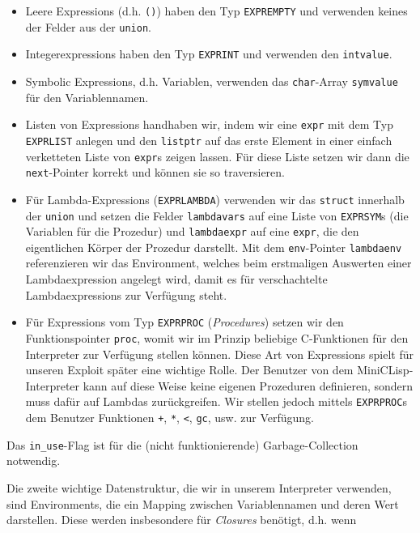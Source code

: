 \begin{itemize}
    \item Leere Expressions (d.h. \texttt{()}) haben den Typ \texttt{EXPREMPTY}
      und verwenden keines der Felder aus der \texttt{union}.
    \item Integerexpressions haben den Typ \texttt{EXPRINT} und verwenden den
      \texttt{intvalue}.
    \item Symbolic Expressions, d.h. Variablen, verwenden das
      \texttt{char}-Array \texttt{symvalue} für den Variablennamen.
    \item Listen von Expressions handhaben wir, indem wir eine \texttt{expr}
      mit dem Typ \texttt{EXPRLIST} anlegen und den \texttt{listptr} auf das
      erste Element in einer einfach verketteten Liste von \texttt{expr}s
      zeigen lassen. Für diese Liste setzen wir dann die \texttt{next}-Pointer
      korrekt und können sie so traversieren.
    \item Für Lambda-Expressions (\texttt{EXPRLAMBDA}) verwenden wir das
      \texttt{struct} innerhalb der \texttt{union} und setzen die Felder
      \texttt{lambdavars} auf eine Liste von \texttt{EXPRSYM}s (die Variablen
      für die Prozedur) und \texttt{lambdaexpr} auf eine \texttt{expr}, die
      den eigentlichen Körper der Prozedur darstellt. Mit dem \texttt{env}-Pointer
      \texttt{lambdaenv} referenzieren wir das Environment, welches beim
      erstmaligen Auswerten einer Lambdaexpression angelegt wird, damit es für
      verschachtelte Lambdaexpressions zur Verfügung steht.
    \item Für Expressions vom Typ \texttt{EXPRPROC} (\emph{Procedures}) setzen wir den
      Funktionspointer \texttt{proc}, womit wir im Prinzip beliebige
      C-Funktionen für den Interpreter zur Verfügung stellen können.
      Diese Art von Expressions spielt für unseren Exploit später eine
      wichtige Rolle.
      Der Benutzer von dem MiniCLisp-Interpreter kann auf diese Weise keine
      eigenen Prozeduren definieren, sondern muss dafür auf Lambdas
      zurückgreifen. Wir stellen jedoch mittels \texttt{EXPRPROC}s dem 
      Benutzer Funktionen \texttt{+}, \texttt{*}, \texttt{<}, \texttt{gc}, usw.
      zur Verfügung.
\end{itemize}
Das \texttt{in\_use}-Flag ist für die (nicht funktionierende) Garbage-Collection
notwendig.
\par
Die zweite wichtige Datenstruktur, die wir in unserem Interpreter verwenden,
sind Environments, die ein Mapping zwischen Variablennamen und deren Wert
darstellen. Diese werden insbesondere für \emph{Closures} benötigt, d.h. wenn
